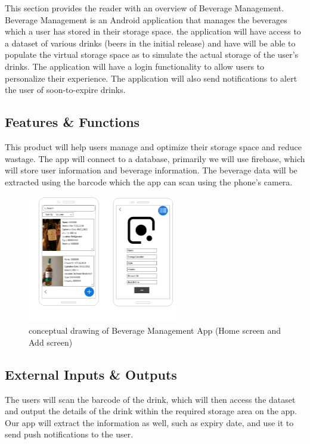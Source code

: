 This section provides the reader with an overview of Beverage Management. Beverage Management is an Android 
application that manages the beverages which a user has stored in their storage space. the application will have access
to a dataset of various drinks (beers in the initial release) and have will be able to populate the virtual storage 
space as to simulate the actual storage of the user's drinks. The application will have a login functionality to allow 
users to personalize their experience. The application will also send notifications to alert the user of 
soon-to-expire drinks.

\subsection{Features \& Functions}
This product will help users manage and optimize their storage space and reduce wastage. The app will connect to a database,
primarily we will use firebase, which will store user information and beverage information. The beverage data will be extracted
using the barcode which the app can scan using the phone's camera.

\begin{figure}[h!]
	\centering
   	\includegraphics[width=0.60\textwidth]{images/CD.png}
    \caption{ conceptual drawing of Beverage Management App (Home screen and Add screen) }
\end{figure}

\subsection{External Inputs \& Outputs}
The users will scan the barcode of the drink, which will then access the dataset and output the details of the drink within the required storage area on the app.
Our app will extract the information as well, such as expiry date, and use it to send push notifications to the user.

